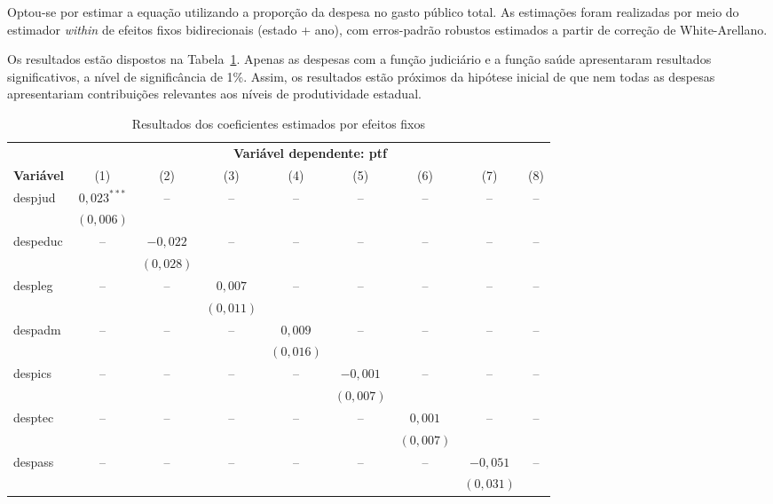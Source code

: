 \documentclass[
  12pt,
  a4paper,
  oneside,
  brazil,
  chapter=TITLE,
  section=TITLE
]{abntex2}
\begin{document}
Optou-se por estimar a equação utilizando a proporção da despesa no gasto público total. As estimações foram realizadas por meio do estimador \textit{within} de efeitos fixos bidirecionais (estado + ano), com erros-padrão robustos estimados a partir de correção de White-Arellano.

Os resultados estão dispostos na Tabela~\ref{tab:resultados}. Apenas as despesas com a função judiciário e a função saúde apresentaram resultados significativos, a nível de significância de 1\%. Assim, os resultados estão próximos da hipótese inicial de que nem todas as despesas apresentariam contribuições relevantes aos níveis de produtividade estadual.

\begin{table}[H]
  \centering
  \caption{Resultados dos coeficientes estimados por efeitos fixos}
  \label{tab:resultados}
  \footnotesize
  \begin{tabular}{lcccccccc}
    \toprule
    & \multicolumn{8}{c}{\textbf{Variável dependente: ptf}} \\
    \cmidrule(lr){2-9}
    \textbf{Variável} & (1) & (2) & (3) & (4) & (5) & (6) & (7) & (8) \\
    \midrule
    despjud
      & $0{,}023^{***}$ & -- & -- & -- & -- & -- & -- & -- \\
      & $(0{,}006)$ & & & & & & & \\[3pt]
    despeduc
      & -- & $-0{,}022$ & -- & -- & -- & -- & -- & -- \\
      &    & $(0{,}028)$ & & & & & & \\[3pt]
    despleg
      & -- & -- & $0{,}007$ & -- & -- & -- & -- & -- \\
      &    &    & $(0{,}011)$ & & & & & \\[3pt]
    despadm
      & -- & -- & -- & $0{,}009$ & -- & -- & -- & -- \\
      &    &    &    & $(0{,}016)$ & & & & \\[3pt]
    despics
      & -- & -- & -- & -- & $-0{,}001$ & -- & -- & -- \\
      &    &    &    &    & $(0{,}007)$ & & & \\[3pt]
    desptec
      & -- & -- & -- & -- & -- & $0{,}001$ & -- & -- \\
      &    &    &    &    &    & $(0{,}007)$ & & \\[3pt]
    despass
      & -- & -- & -- & -- & -- & -- & $-0{,}051$ & -- \\
      &    &    &    &    &    &    & $(0{,}031)$ & \\[3pt]

\end{tabular}
\end{table}
\end{document}
